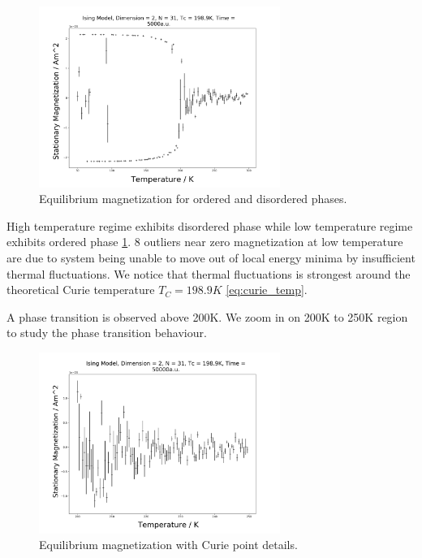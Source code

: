 \documentclass[%
showkeys,
bibnotes,
amsmath,amssymb,
floatfix,
]{revtex4-1}
\begin{document}
\begin{figure}[H] \centering
	\includegraphics[width=0.7\textwidth]{../figures/mag_mag_31_50_2_125}
	\caption{\label{fig:mag_mag_31_50_2_125} Equilibrium magnetization for ordered and disordered phases.}
\end{figure}

High temperature regime exhibits disordered phase while low temperature regime exhibits ordered phase \ref{fig:mag_mag_31_50_2_125}. 8 outliers near zero magnetization at low temperature are due to system being unable to move out of local energy minima by insufficient thermal fluctuations. We notice that thermal fluctuations is strongest around the theoretical Curie temperature $T_C=198.9K$ \ref{eq:curie_temp}.

A phase transition is observed above 200K. We zoom in on 200K to 250K region to study the phase transition behaviour.

\begin{figure}[H] \centering
	\includegraphics[width=0.7\textwidth]{../figures/mag_mag_31_200_0.5_100}
	\caption{\label{fig:mag_mag_31_200_0.5_100} Equilibrium magnetization with Curie point details.}
\end{figure}
\end{document}
